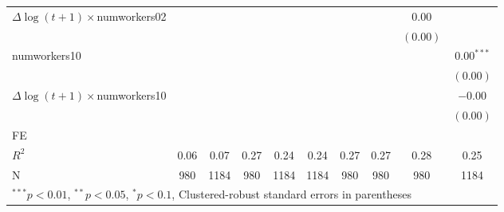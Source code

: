 \begin{tabular}{l c c c c c c c c c }
$\Delta \log(t+1) \times$numworkers02 &              &              &              &              &              &              &              & $0.00$       &              \\
                     &              &              &              &              &              &              &              & $(0.00)$     &              \\
numworkers10         &              &              &              &              &              &              &              &              & $0.00^{***}$ \\
                     &              &              &              &              &              &              &              &              & $(0.00)$     \\
$\Delta \log(t+1) \times$numworkers10 &              &              &              &              &              &              &              &              & $-0.00$      \\
                     &              &              &              &              &              &              &              &              & $(0.00)$     \\
\hline
FE          &                &                &                &                &                &                &                &                &                \\ 
\hline
$R^2$                & 0.06         & 0.07         & 0.27         & 0.24         & 0.24         & 0.27         & 0.27         & 0.28         & 0.25         \\
N                    & 980          & 1184         & 980          & 1184         & 1184         & 980          & 980          & 980          & 1184         \\
\hline
\multicolumn{10}{l}{\scriptsize{$^{***}p<0.01$, $^{**}p<0.05$, $^*p<0.1$, Clustered-robust standard errors in parentheses}}
\end{tabular}

